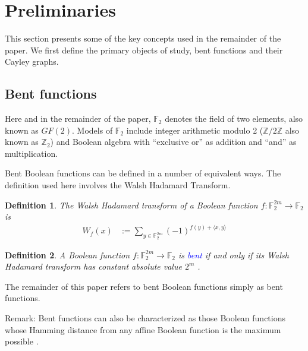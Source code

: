 \documentclass[12pt,a4paper]{article}
\newcommand{\mb}[1]{\mathbb{#1}}
\newcommand{\F}{\mb{F}}
\newcommand{\Z}{\mb{Z}}
\newcommand{\To}{\rightarrow}
\newcommand{\Emph}[1]{\emph{\textcolor{blue}{#1}}}
\newtheorem{Definition}{Definition}
\begin{document}
\section{Preliminaries}
\label{sec-Preliminaries}

This section presents some of the key concepts used in the remainder of the paper.
We first define the primary objects of study, bent functions and their Cayley graphs.

\subsection{Bent functions}

Here and in the remainder of the paper, $\F_2$ denotes the field of two elements,
also known as $GF(2)$. Models of $\F_2$ include integer arithmetic modulo 2
($\Z/2\Z$ also known as $\Z_2$) and Boolean algebra with ``exclusive or'' as addition and ``and''
as multiplication.

Bent Boolean functions can be defined in a number of equivalent ways.
The definition used here involves the Walsh Hadamard Transform.
\begin{Definition}
\label{def-Walsh-Hadamard-transform}
The Walsh Hadamard transform of
a Boolean function $f : \F_2^{2m} \To \F_2$ is
\begin{align*}
W_f(x)
&:=
\sum_{y \in \F_2^{2m}} (-1)^{f(y) + \langle x, y \rangle}
\end{align*}
\end{Definition}

\begin{Definition}
\label{def-Bent-function}
A Boolean function $f : \F_2^{2m} \To \F_2$ is \Emph{bent}
if and only if its Walsh Hada\-mard transform has constant absolute value $2^{m}$ \cite[p. 74]{Dil74}
\cite[p. 300]{Rot76}.
\end{Definition}

The remainder of this paper refers to bent Boolean functions simply as bent functions.

Remark: Bent functions can also be characterized as those Boolean functions whose Hamming distance
from any affine Boolean function is the maximum possible \cite[Theorem 3.3]{MeiS90}.
\end{document}
